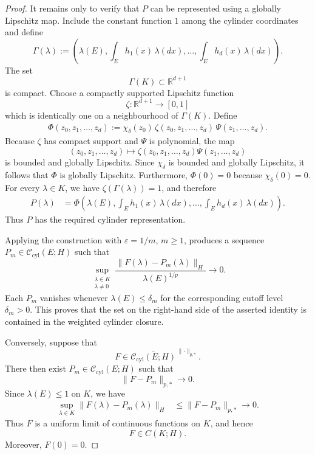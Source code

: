 \documentclass[10pt,a4paper]{amsart}
\begin{document}
\begin{proof}
It remains only to verify that \(P\) can be represented using a
globally Lipschitz map. Include the constant function \(1\) among the
cylinder coordinates and define
\[
\Gamma(\lambda)
:=
\left(
        \lambda(E),
        \int_Eh_1(x)\,\lambda(dx),
        \ldots,
        \int_Eh_d(x)\,\lambda(dx)
\right).
\]
The set
\[
        \Gamma(K)\subset\mathbb R^{d+1}
\]
is compact. Choose a compactly supported Lipschitz function
\[
        \zeta:\mathbb R^{d+1}\longrightarrow[0,1]
\]
which is identically one on a neighbourhood of \(\Gamma(K)\). Define
\[
\begin{aligned}
\Phi(z_0,z_1,\ldots,z_d)
:=
\chi_\delta(z_0)\,
\zeta(z_0,z_1,\ldots,z_d)\,
\Psi(z_1,\ldots,z_d).
\end{aligned}
\]
Because \(\zeta\) has compact support and \(\Psi\) is polynomial, the
map
\[
        (z_0,z_1,\ldots,z_d)
        \longmapsto
        \zeta(z_0,z_1,\ldots,z_d)\Psi(z_1,\ldots,z_d)
\]
is bounded and globally Lipschitz. Since \(\chi_\delta\) is bounded and
globally Lipschitz, it follows that \(\Phi\) is globally Lipschitz.
Furthermore,
$
        \Phi(0)=0$
because \(\chi_\delta(0)=0\). For every \(\lambda\in K\), we have \(\zeta(\Gamma(\lambda))=1\), and
therefore
\[
\begin{aligned}
P(\lambda)
&=
\Phi
\left(
        \lambda(E),
        \int_Eh_1(x)\,\lambda(dx),
        \ldots,
        \int_Eh_d(x)\,\lambda(dx)
\right).
\end{aligned}
\]
Thus \(P\) has the required cylinder representation.

Applying the construction with \(\varepsilon=1/m\), \(m\ge1\), produces
a sequence \(P_m\in\mathcal C_{\mathrm{cyl}}(E;H)\) such that
\[
\sup_{\substack{\lambda\in K\\ \lambda\ne0}}
\frac{\lVert F(\lambda)-P_m(\lambda)\rVert_H}
     {\lambda(E)^{1/p}}
\longrightarrow0.
\]
Each \(P_m\) vanishes whenever
$
        \lambda(E)\le\delta_m
$
for the corresponding cutoff level \(\delta_m>0\). This proves that
the set on the right-hand side of the asserted identity is contained
in the weighted cylinder closure.

Conversely, suppose that
\[
        F\in
        \overline{\mathcal C_{\mathrm{cyl}}(E;H)}
        ^{\,\lVert\cdot\rVert_{p,*}}.
\]
There then exist \(P_m\in\mathcal C_{\mathrm{cyl}}(E;H)\) such that
\[
        \lVert F-P_m\rVert_{p,*}\longrightarrow0.
\]
Since \(\lambda(E)\le1\) on \(K\), we have
\[
\begin{aligned}
\sup_{\lambda\in K}
\lVert F(\lambda)-P_m(\lambda)\rVert_H
&\le
\lVert F-P_m\rVert_{p,*}
\longrightarrow0.
\end{aligned}
\]
Thus \(F\) is a uniform limit of continuous functions on \(K\), and
hence
\[
        F\in C(K;H).
\]
Moreover, \(F(0)=0\).


\end{proof}
\end{document}
